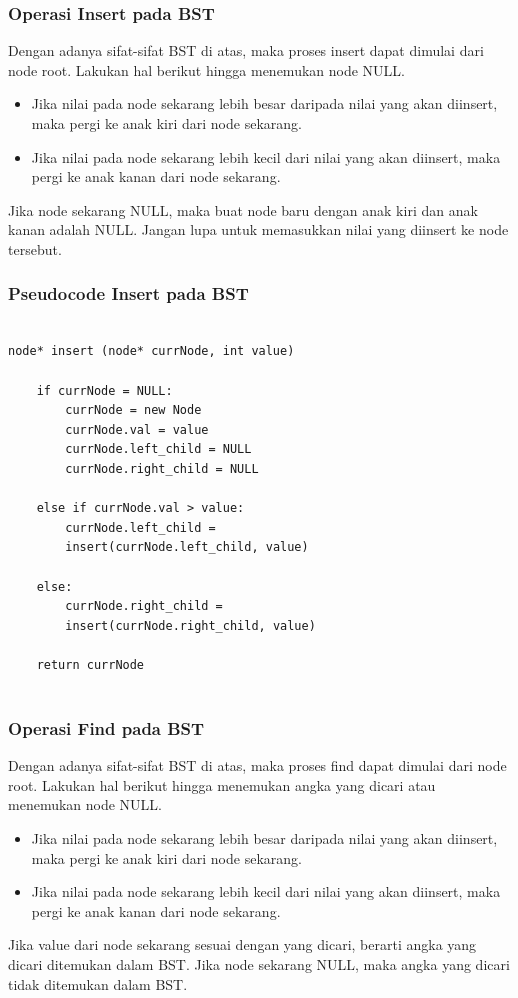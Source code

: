 \begin{frame}
\frametitle{Operasi Insert pada BST}

Dengan adanya sifat-sifat BST di atas, maka proses insert dapat dimulai dari node root. Lakukan hal berikut hingga menemukan node NULL.
\begin{itemize}
  \item Jika nilai pada node sekarang lebih besar daripada nilai yang akan diinsert, maka pergi ke anak kiri dari node sekarang.
  \item Jika nilai pada node sekarang lebih kecil dari nilai yang akan diinsert, maka pergi ke anak kanan dari node sekarang.\newline
\end{itemize}

Jika node sekarang NULL, maka buat node baru dengan anak kiri dan anak kanan adalah NULL. Jangan lupa untuk memasukkan nilai yang diinsert ke node tersebut.
\end{frame}

\begin{frame}[fragile]
\frametitle{Pseudocode Insert pada BST}

\begin{lstlisting}

node* insert (node* currNode, int value)

    if currNode = NULL:
        currNode = new Node
        currNode.val = value
        currNode.left_child = NULL
        currNode.right_child = NULL
  
    else if currNode.val > value:
        currNode.left_child =
        insert(currNode.left_child, value)
  
    else:
        currNode.right_child = 
        insert(currNode.right_child, value)
    
    return currNode
    
\end{lstlisting}
\end{frame}

\begin{frame}
\frametitle{Operasi Find pada BST}

Dengan adanya sifat-sifat BST di atas, maka proses find dapat dimulai dari node root. Lakukan hal berikut hingga menemukan angka yang dicari atau menemukan node NULL.
\begin{itemize}
  \item Jika nilai pada node sekarang lebih besar daripada nilai yang akan diinsert, maka pergi ke anak kiri dari node sekarang.
  \item Jika nilai pada node sekarang lebih kecil dari nilai yang akan diinsert, maka pergi ke anak kanan dari node sekarang.\newline
\end{itemize}
Jika value dari node sekarang sesuai dengan yang dicari, berarti angka yang dicari ditemukan dalam BST.
\newline\newline
Jika node sekarang NULL, maka angka yang dicari tidak ditemukan dalam BST.
\end{frame}

